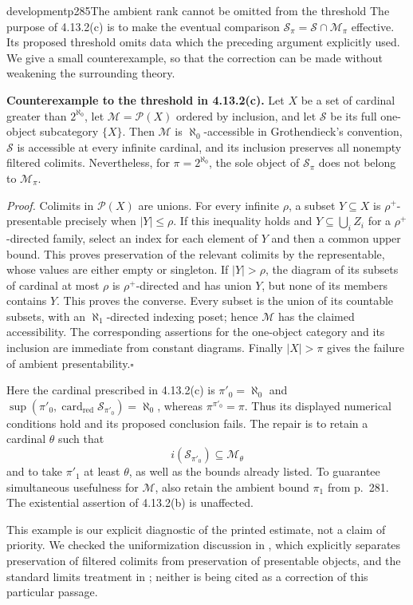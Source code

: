 \begin{dcomment}{development}{p285}{The ambient rank cannot be omitted from the threshold}
The purpose of 4.13.2(c) is to make the eventual comparison $\mathcal S_\pi=\mathcal S\cap\mathcal M_\pi$ effective. Its proposed threshold omits data which the preceding argument explicitly used. We give a small counterexample, so that the correction can be made without weakening the surrounding theory.

\textbf{Counterexample to the threshold in 4.13.2(c).}\ours
Let $X$ be a set of cardinal greater than $2^{\aleph_0}$, let $\mathcal M=\mathcal P(X)$ ordered by inclusion, and let $\mathcal S$ be its full one-object subcategory $\{X\}$. Then $\mathcal M$ is $\aleph_0$-accessible in Grothendieck's convention, $\mathcal S$ is accessible at every infinite cardinal, and its inclusion preserves all nonempty filtered colimits. Nevertheless, for $\pi=2^{\aleph_0}$, the sole object of $\mathcal S_\pi$ does not belong to $\mathcal M_\pi$.

\textit{Proof.} Colimits in $\mathcal P(X)$ are unions. For every infinite $\rho$, a subset $Y\subseteq X$ is $\rho^+$-presentable precisely when $|Y|\leq\rho$. If this inequality holds and $Y\subseteq\bigcup_i Z_i$ for a $\rho^+$-directed family, select an index for each element of $Y$ and then a common upper bound. This proves preservation of the relevant colimits by the representable, whose values are either empty or singleton. If $|Y|>\rho$, the diagram of its subsets of cardinal at most $\rho$ is $\rho^+$-directed and has union $Y$, but none of its members contains $Y$. This proves the converse. Every subset is the union of its countable subsets, with an $\aleph_1$-directed indexing poset; hence $\mathcal M$ has the claimed accessibility. The corresponding assertions for the one-object category and its inclusion are immediate from constant diagrams. Finally $|X|>\pi$ gives the failure of ambient presentability.\hfill$\square$

Here the cardinal prescribed in 4.13.2(c) is $\pi'_0=\aleph_0$ and $\sup(\pi'_0,\operatorname{card}_{\mathrm{red}}\mathcal S_{\pi'_0})=\aleph_0$, whereas $\pi^{\pi'_0}=\pi$. Thus its displayed numerical conditions hold and its proposed conclusion fails. The repair is to retain a cardinal $\theta$ such that
\[
 i(\mathcal S_{\pi'_0})\subseteq\mathcal M_\theta
\]
and to take $\pi'_1$ at least $\theta$, as well as the bounds already listed. To guarantee simultaneous usefulness for $\mathcal M$, also retain the ambient bound $\pi_1$ from p.~281. The existential assertion of 4.13.2(b) is unaffected.

This example is our explicit diagnostic of the printed estimate, not a claim of priority. We checked the uniformization discussion in \citet[\S2.3]{Raptis2020}, which explicitly separates preservation of filtered colimits from preservation of presentable objects, and the standard limits treatment in \citet{Positselski2024Limits}; neither is being cited as a correction of this particular passage.
\end{dcomment}


